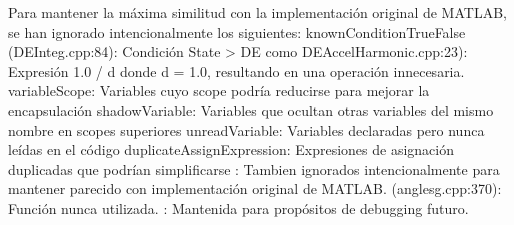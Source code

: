 \markdownRendererInterblockSeparator
{}Para mantener la máxima similitud con la implementación original de MATLAB, se han ignorado intencionalmente los siguientes:\markdownRendererInterblockSeparator
{}knownConditionTrueFalse (DEInteg.cpp:84): Condición State\markdownRendererUnderscore{} > DE como DEAccelHarmonic.cpp:23): Expresión 1.0 / d donde d = 1.0, resultando en una operación innecesaria. variableScope: Variables cuyo scope podría reducirse para mejorar la encapsulación shadowVariable: Variables que ocultan otras variables del mismo nombre en scopes superiores unreadVariable: Variables declaradas pero nunca leídas en el código duplicateAssignExpression: Expresiones de asignación duplicadas que podrían simplificarse\markdownRendererInterblockSeparator
{}: Tambien ignorados intencionalmente para mantener parecido con implementación original de MATLAB.\markdownRendererInterblockSeparator
{}
\markdownRendererSectionEnd \markdownRendererSectionBegin
{}\markdownRendererInterblockSeparator
{}
\markdownRendererSectionEnd \markdownRendererSectionBegin
{}\markdownRendererInterblockSeparator
{}\markdownRendererUlBeginTight
\markdownRendererUlItem {} (anglesg.cpp:370): Función  nunca utilizada.\markdownRendererUlItemEnd 
\markdownRendererUlEndTight \markdownRendererInterblockSeparator
{}: Mantenida para propósitos de debugging futuro.
\markdownRendererSectionEnd 
\markdownRendererSectionEnd 
\markdownRendererSectionEnd 
\markdownRendererSectionEnd \markdownRendererDocumentEnd